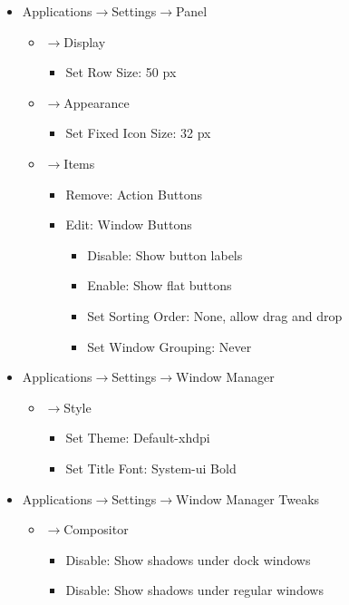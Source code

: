 \documentclass{memoir}
\begin{document}
\pagebreak
\begin{itemize}
\item[]{Applications$\rightarrow$Settings$\rightarrow$Panel}
  \begin{itemize}
  \item[]{$\rightarrow$Display}
    \begin{itemize}
      \item[]{Set Row Size: 50 px}
    \end{itemize}
  \item[]{$\rightarrow$Appearance}
    \begin{itemize}
      \item[]{Set Fixed Icon Size: 32 px}
    \end{itemize}
  \item[]{$\rightarrow$Items}
    \begin{itemize}
      \item[]{Remove: Action Buttons}
      \item[]{Edit: Window Buttons}
        \begin{itemize}
          \item[]{Disable: Show button labels}
          \item[]{Enable: Show flat buttons}
          \item[]{Set Sorting Order: None, allow drag and drop}
          \item[]{Set Window Grouping: Never}
        \end{itemize}
    \end{itemize}
  \end{itemize}
\end{itemize}

\begin{itemize}
\item[]{Applications$\rightarrow$Settings$\rightarrow$Window Manager}
  \begin{itemize}
  \item[]{$\rightarrow$Style}
    \begin{itemize}
      \item[]{Set Theme: Default-xhdpi}
      \item[]{Set Title Font: System-ui Bold}
    \end{itemize}
  \end{itemize}
\end{itemize}

\begin{itemize}
\item[]{Applications$\rightarrow$Settings$\rightarrow$Window Manager Tweaks}
  \begin{itemize}
  \item[]{$\rightarrow$Compositor}
    \begin{itemize}
      \item[]{Disable: Show shadows under dock windows}
      \item[]{Disable: Show shadows under regular windows}
    \end{itemize}
  \end{itemize}
\end{itemize}
\end{document}
